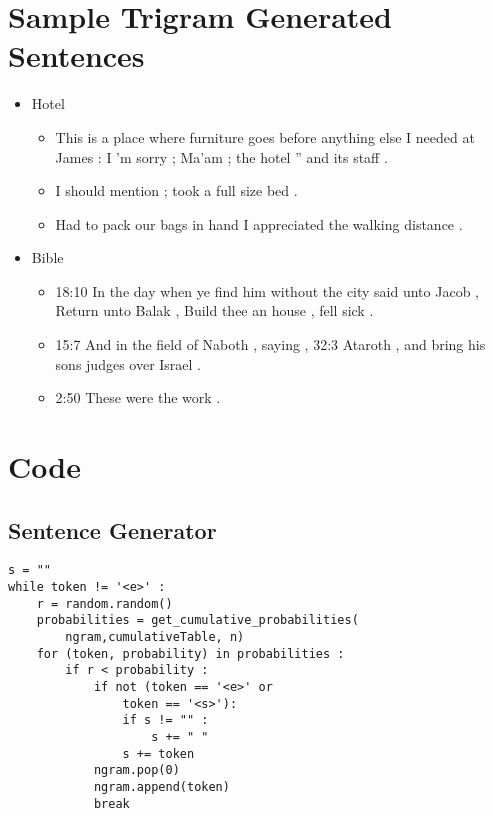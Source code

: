 \documentclass[11pt]{article}
\begin{document}
\section{Sample Trigram Generated Sentences}
\begin{itemize}
    \item Hotel
        \begin{itemize}
        \item This is a place where furniture goes before anything else I needed at James : I 'm sorry ; Ma'am ; the hotel '' and its staff .

        \item I should mention ; took a full size bed .

        \item Had to pack our bags in hand I appreciated the walking distance .

        \end{itemize}
    \item Bible
        \begin{itemize}
        
        \item 18:10 In the day when ye find him without the city said unto Jacob , Return unto Balak , Build thee an house , fell sick .

        \item 15:7 And in the field of Naboth , saying , 32:3 Ataroth , and bring his sons judges over Israel .

        \item 2:50 These were the work .

        \end{itemize}
\end{itemize}  

\section{Code}
\subsection{Sentence Generator}

\begin{lstlisting}[frame=single]  % Start your code-block
s = ""
while token != '<e>' :
    r = random.random()
    probabilities = get_cumulative_probabilities(
        ngram,cumulativeTable, n)
    for (token, probability) in probabilities :
        if r < probability :
            if not (token == '<e>' or 
                token == '<s>'):
                if s != "" :
                    s += " "
                s += token
            ngram.pop(0)
            ngram.append(token)
            break
\end{lstlisting}
\end{document}
